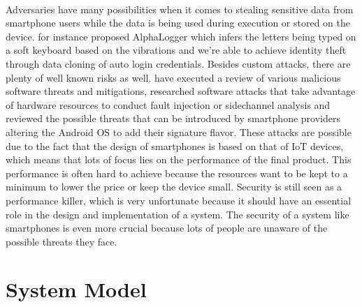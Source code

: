 \paragraph*{}
Adversaries have many possibilities when it comes to stealing sensitive data from smartphone users while the data is being used during execution or stored on the device. \cite{JavedAbdulRehman2020Adms} for instance proposed AlphaLogger which infers the letters being typed on a soft keyboard based on the vibrations and \cite{SongWenna2020ADAv} we're able to achieve identity theft through data cloning of auto login credentials. Besides custom attacks, there are plenty of well known risks as well. \cite{SetyawanRico2020Abro} have executed a review of various malicious software threats and mitigations, \cite{GRAVELLIERJoseph2021RHAo} researched software attacks that take advantage of hardware resources to conduct fault injection or sidechannel analysis and \cite{KumarSudesh2020AoAS} reviewed the possible threats that can be introduced by smartphone providers altering the Android OS to add their signature flavor. These attacks are possible due to the fact that the design of smartphones is based on that of IoT devices, which means that lots of focus lies on the performance of the final product. This performance is often hard to achieve because the resources want to be kept to a minimum to lower the price or keep the device small. Security is still seen as a performance killer, which is very unfortunate because it should have an essential role in the design and implementation of a system. The security of a system like smartphones is even more crucial because lots of people are unaware of the possible threats they face.

\section{System Model}

